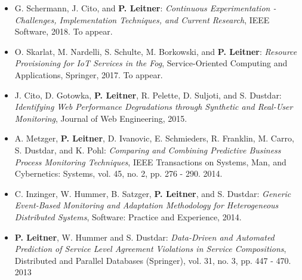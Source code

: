 \documentclass[paper=letter,fontsize=11pt]{scrartcl} %
\begin{document}
\begin{itemize}
	\item  G. Schermann, J. Cito, and \textbf{P. Leitner}: \emph{Continuous Experimentation - Challenges, Implementation Techniques, and Current Research}, IEEE Software, 2018. To appear.
	\item  O. Skarlat, M. Nardelli, S. Schulte, M. Borkowski, and \textbf{P. Leitner}: \emph{Resource Provisioning for IoT Services in the Fog}, Service-Oriented Computing and Applications, Springer, 2017. To appear.
  \item J. Cito, D. Gotowka, \textbf{P. Leitner}, R. Pelette, D. Suljoti, and S. Dustdar: \emph{Identifying Web Performance Degradations through Synthetic and Real-User Monitoring}, Journal of Web Engineering, 2015.
  \item  A. Metzger, \textbf{P. Leitner}, D. Ivanovic, E. Schmieders, R. Franklin, M. Carro, S. Dustdar, and K. Pohl: \emph{Comparing and Combining Predictive Business Process Monitoring Techniques}, IEEE Transactions on Systems, Man, and Cybernetics: Systems, vol. 45, no. 2, pp. 276 - 290. 2014.
  \item C. Inzinger, W. Hummer, B. Satzger, \textbf{P. Leitner}, and S. Dustdar: \emph{Generic Event-Based Monitoring and Adaptation Methodology for Heterogeneous Distributed Systems}, Software: Practice and Experience, 2014.
  \item \textbf{P. Leitner}, W. Hummer and S. Dustdar: \emph{Data-Driven and Automated Prediction of Service Level Agreement Violations in Service Compositions}, Distributed and Parallel Databases (Springer), vol. 31, no. 3, pp. 447 - 470. 2013

\end{itemize}
\end{document}
